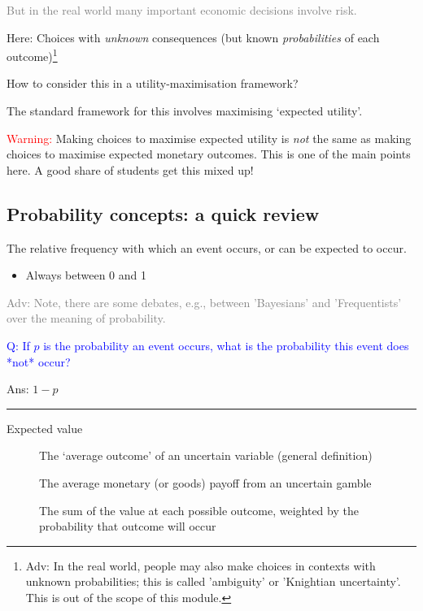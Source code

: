 \documentclass[]{article}
\providecommand{\tightlist}{%
  \setlength{\itemsep}{0pt}\setlength{\parskip}{0pt}}
\let\rmarkdownfootnote\footnote%
\def\footnote{\protect\rmarkdownfootnote}
\begin{document}
\textcolor{gray}{But in the real world many important economic decisions involve risk.}

\bigskip

Here: Choices with \emph{unknown} consequences (but known \emph{probabilities} of each outcome)\footnote{Adv: In the real world, people may also make choices in contexts with unknown probabilities; this is called 'ambiguity' or 'Knightian uncertainty'. This is out of the scope of this module.}

How to consider this in a utility-maximisation framework?

The standard framework for this involves maximising `expected utility'.

\textcolor{red}{Warning:} Making choices to maximise expected utility is \emph{not} the same as making choices to maximise expected monetary outcomes. This is one of the main points here. A good share of students get this mixed up!

\hypertarget{probability-concepts-a-quick-review}{%
\subsection{Probability concepts: a quick review}\label{probability-concepts-a-quick-review}}

\begin{description}
\tightlist
\item[Probability]
The relative frequency with which an event occurs, or can be expected to occur.
\end{description}

\begin{itemize}
\tightlist
\item
  Always between 0 and 1
\end{itemize}

\textcolor{gray}{Adv: Note, there are some debates, e.g., between 'Bayesians' and 'Frequentists' over the meaning of probability.}

\textcolor{blue}{Q: If $p$ is the probability an event occurs, what is the probability this event does *not* occur?}

Ans: \(1-p\)

\begin{center}\rule{0.5\linewidth}{\linethickness}\end{center}

\begin{description}
\item[Expected value]
The `average outcome' of an uncertain variable (general definition)
\item[\bigskip]
The average monetary (or goods) payoff from an uncertain gamble
\item[\bigskip]
The sum of the value at each possible outcome, weighted by the probability that outcome will occur
\end{description}
\end{document}
